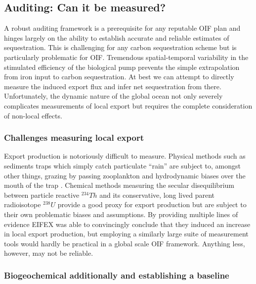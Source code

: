 \subsection{Auditing: Can it be measured? 
}

A robust auditing framework is a prerequisite for any reputable OIF plan and hinges largely on the ability to establish accurate and reliable estimates of sequestration. This is challenging for any carbon sequestration scheme but is particularly problematic for OIF. Tremendous spatial-temporal variability in the stimulated efficiency of the biological pump prevents the simple extrapolation from iron input to carbon sequestration. At best we can attempt to directly measure the induced export flux and infer net sequestration from there. Unfortunately, the dynamic nature of the global ocean not only severely complicates measurements of local export but requires the complete consideration of non-local effects. 

\subsubsection{Challenges measuring local export}

Export production is notoriously difficult to measure. Physical methods such as sediments traps which simply catch particulate “rain” are subject to, amongst other things, grazing by passing zooplankton and hydrodynamic biases over the mouth of the trap \parencite{Buesselerassessmentusesediment2007}. Chemical methods measuring the secular disequilibrium between particle reactive $^{234}Th$ and its conservative, long lived parent radioisotope $^{238}U$ provide a good proxy for export production \parencite{Buesselerdecouplingproductionparticulate1998} but are subject to their own problematic biases and assumptions. By providing multiple lines of evidence EIFEX \parencite{SmetacekDeepcarbonexport2012} was able to convincingly conclude that they induced an increase in local export production, but employing a similarly large suite of measurement tools would hardly be practical in a global scale OIF framework. Anything less, however, may not be reliable.  


\subsubsection{Biogeochemical additionally and establishing a baseline}

